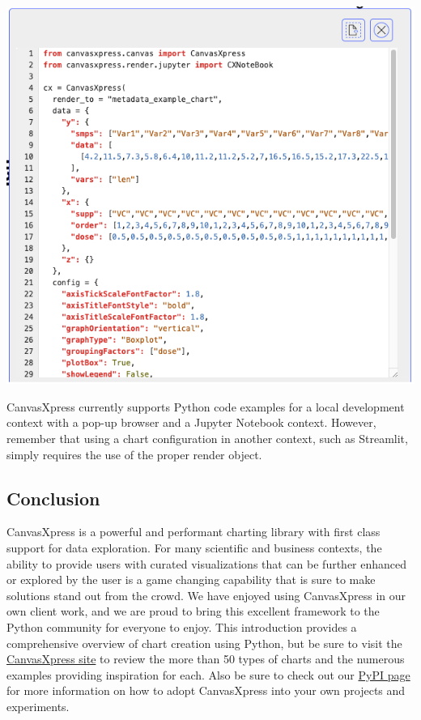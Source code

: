 \documentclass[
  letterpaper,
  DIV=11,
  numbers=noendperiod]{scrartcl}
\begin{document}
\includegraphics{reproducible_code.png}

CanvasXpress currently supports Python code examples for a local
development context with a pop-up browser and a Jupyter Notebook
context. However, remember that using a chart configuration in another
context, such as Streamlit, simply requires the use of the proper render
object.

\hypertarget{conclusion}{%
\subsection{Conclusion}\label{conclusion}}

CanvasXpress is a powerful and performant charting library with first
class support for data exploration. For many scientific and business
contexts, the ability to provide users with curated visualizations that
can be further enhanced or explored by the user is a game changing
capability that is sure to make solutions stand out from the crowd. We
have enjoyed using CanvasXpress in our own client work, and we are proud
to bring this excellent framework to the Python community for everyone
to enjoy. This introduction provides a comprehensive overview of chart
creation using Python, but be sure to visit the
\href{https://canvasxpress.org}{CanvasXpress site} to review the more
than 50 types of charts and the numerous examples providing inspiration
for each. Also be sure to check out our
\href{https://pypi.org/project/canvasxpress/}{PyPI page} for more
information on how to adopt CanvasXpress into your own projects and
experiments.
\end{document}

